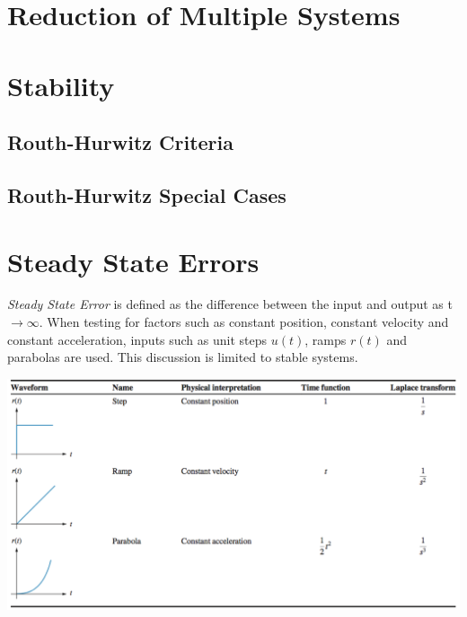 \documentclass[11pt]{article}
\begin{document}
    \pagebreak

    
    \section{Reduction of Multiple Systems}
    
    \pagebreak


    \section{Stability}
    \subsection{Routh-Hurwitz Criteria}
    \subsection{Routh-Hurwitz Special Cases}
    
    \pagebreak


    \section{Steady State Errors}

    \textit{Steady State Error} is defined as the difference between the input and output as t $\rightarrow \infty$. When testing for factors such as constant position, constant velocity and constant acceleration, inputs such as unit steps $u(t)$, ramps $r(t)$ and parabolas are used. This discussion is limited to stable systems.\\
   
    \begin{center}
        \includegraphics[width=300 px]{img/inputs} \\
    \end{center}
\end{document}
